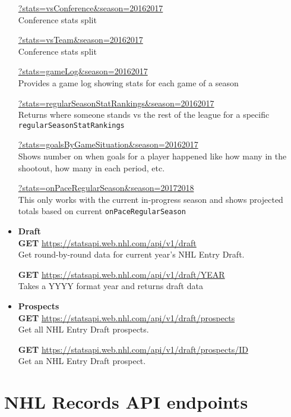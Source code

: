 \documentclass[11pt]{article}
\begin{document}
\begin{itemize}
            \url{?stats=vsConference&season=20162017} \\
            Conference stats split

            \url{?stats=vsTeam&season=20162017} \\
            Conference stats split

            \url{?stats=gameLog&season=20162017} \\
            Provides a game log showing stats for each game of a season

            \url{?stats=regularSeasonStatRankings&season=20162017} \\
            Returns where someone stands vs the rest of the league for a specific \texttt{regularSeasonStatRankings}

            \url{?stats=goalsByGameSituation&season=20162017} \\
            Shows number on when goals for a player happened like how many in the shootout, how many in each period, etc.

            \url{?stats=onPaceRegularSeason&season=20172018} \\
            This only works with the current in-progress season and shows projected totals based on current \texttt{onPaceRegularSeason}

        \item \textbf{Draft} \\
            \textbf{GET} \url{https://statsapi.web.nhl.com/api/v1/draft} \\
            Get round-by-round data for current year's NHL Entry Draft.

            \textbf{GET} \url{https://statsapi.web.nhl.com/api/v1/draft/YEAR} \\
            Takes a YYYY format year and returns draft data

        \item \textbf{Prospects} \\
            \textbf{GET} \url{https://statsapi.web.nhl.com/api/v1/draft/prospects} \\
            Get all NHL Entry Draft prospects.

            \textbf{GET} \url{https://statsapi.web.nhl.com/api/v1/draft/prospects/ID} \\
            Get an NHL Entry Draft prospect.

    \end{itemize}


    \section{NHL Records API endpoints} \label{sec:nhl_records}
\end{document}
